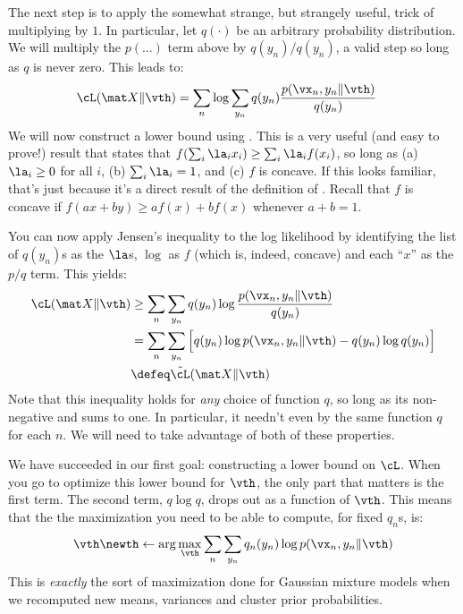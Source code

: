 The next step is to apply the somewhat strange, but strangely useful,
trick of multiplying by $1$.  In particular, let $q(\cdot)$ be an
arbitrary probability distribution.  We will multiply the $p(\dots)$
term above by $q(y_n) / q(y_n)$, a valid step so long as $q$ is never
zero.  This leads to:
%
\begin{align}
  \cL(\mat X \| \vth)
  &= \sum_n \log \sum_{y_n} q(y_n) \frac {p(\vx_n, y_n \| \vth)} {q(y_n)}
\end{align}
%
We will now construct a lower bound using .  This is a very useful (and easy to prove!) result that
states that $f(\sum_i \la_i x_i) \geq \sum_i \la_i f(x_i)$, so long as
(a) $\la_i \geq 0$ for all $i$, (b) $\sum_i \la_i = 1$, and (c) $f$ is
concave.  If this looks familiar, that's just because it's a direct
result of the definition of .  Recall that $f$ is
concave if $f(a x + b y) \geq a f(x) + b f(x)$ whenever $a+b=1$.


You can now apply Jensen's inequality to the log likelihood by
identifying the list of $q(y_n)$s as the $\la$s, $\log$ as $f$ (which
is, indeed, concave) and each ``$x$'' as the $p/q$ term.  This yields:
%
\begin{align}
  \cL(\mat X \| \vth)
  &\geq \sum_n \sum_{y_n} q(y_n) \log \frac {p(\vx_n, y_n \| \vth)} {q(y_n)}\\
  &= \sum_n \sum_{y_n} \Big[ q(y_n) \log p(\vx_n, y_n \| \vth) - q(y_n) \log q(y_n)\Big]\\
  &\defeq \tilde\cL(\mat X \| \vth)
\end{align}
%
Note that this inequality holds for \emph{any} choice of function $q$,
so long as its non-negative and sums to one.  In particular, it
needn't even by the same function $q$ for each $n$.  We will need to
take advantage of both of these properties.

We have succeeded in our first goal: constructing a lower bound on
$\cL$.  When you go to optimize this lower bound for $\vth$, the only
part that matters is the first term.  The second term, $q \log q$,
drops out as a function of $\vth$.  This means that the the
maximization you need to be able to compute, for fixed $q_n$s, is:
%
\begin{align}
  \vth\newth \leftarrow \arg\max_{\vth} \sum_n \sum_{y_n} q_n(y_n) \log p(\vx_n, y_n \| \vth)
\end{align}
%
This is \emph{exactly} the sort of maximization done for Gaussian
mixture models when we recomputed new means, variances and cluster
prior probabilities.

